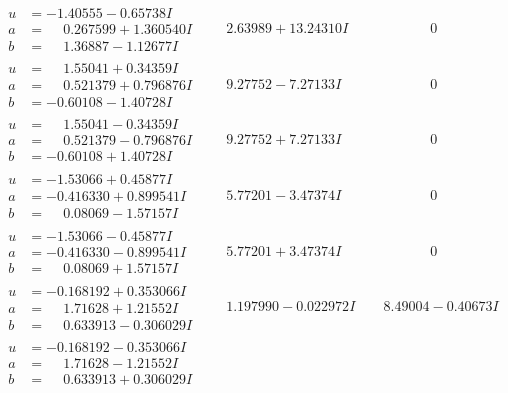 \documentclass[1p]{elsarticle_modified}
\theoremstyle{definition}
\begin{document}
$$\begin{array}{c|c|c}
\begin{aligned}
u &= -1.40555 - 0.65738 I \\
a &= \phantom{-}0.267599 + 1.360540 I \\
b &= \phantom{-}1.36887 - 1.12677 I\end{aligned}
 & \phantom{-}2.63989 + 13.24310 I & \phantom{-0.000000 } 0 \\ \hline\begin{aligned}
u &= \phantom{-}1.55041 + 0.34359 I \\
a &= \phantom{-}0.521379 + 0.796876 I \\
b &= -0.60108 - 1.40728 I\end{aligned}
 & \phantom{-}9.27752 - 7.27133 I & \phantom{-0.000000 } 0 \\ \hline\begin{aligned}
u &= \phantom{-}1.55041 - 0.34359 I \\
a &= \phantom{-}0.521379 - 0.796876 I \\
b &= -0.60108 + 1.40728 I\end{aligned}
 & \phantom{-}9.27752 + 7.27133 I & \phantom{-0.000000 } 0 \\ \hline\begin{aligned}
u &= -1.53066 + 0.45877 I \\
a &= -0.416330 + 0.899541 I \\
b &= \phantom{-}0.08069 - 1.57157 I\end{aligned}
 & \phantom{-}5.77201 - 3.47374 I & \phantom{-0.000000 } 0 \\ \hline\begin{aligned}
u &= -1.53066 - 0.45877 I \\
a &= -0.416330 - 0.899541 I \\
b &= \phantom{-}0.08069 + 1.57157 I\end{aligned}
 & \phantom{-}5.77201 + 3.47374 I & \phantom{-0.000000 } 0 \\ \hline\begin{aligned}
u &= -0.168192 + 0.353066 I \\
a &= \phantom{-}1.71628 + 1.21552 I \\
b &= \phantom{-}0.633913 - 0.306029 I\end{aligned}
 & \phantom{-}1.197990 - 0.022972 I & \phantom{-}8.49004 - 0.40673 I \\ \hline\begin{aligned}
u &= -0.168192 - 0.353066 I \\
a &= \phantom{-}1.71628 - 1.21552 I \\
b &= \phantom{-}0.633913 + 0.306029 I\end{aligned}

\end{array}$$
\end{document}
